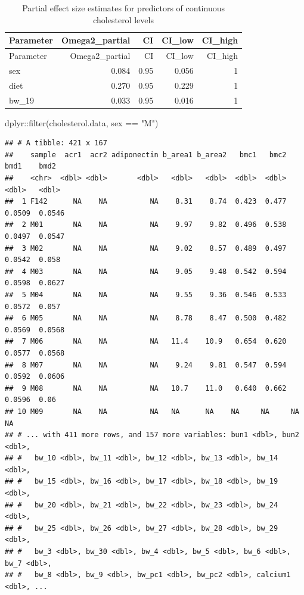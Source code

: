 \documentclass[
]{article}
\newenvironment{Shaded}{\begin{snugshade}}{\end{snugshade}}
\newcommand{\FunctionTok}[1]{\textcolor[rgb]{0.00,0.00,0.00}{#1}}
\newcommand{\NormalTok}[1]{#1}
\newcommand{\SpecialCharTok}[1]{\textcolor[rgb]{0.00,0.00,0.00}{#1}}
\newcommand{\StringTok}[1]{\textcolor[rgb]{0.31,0.60,0.02}{#1}}
\begin{document}
\begin{longtable}[]{@{}lrrrr@{}}
\caption{Partial effect size estimates for predictors of continuous
cholesterol levels}\tabularnewline
\toprule()
Parameter & Omega2\_partial & CI & CI\_low & CI\_high \\
\midrule()
\endfirsthead
\toprule()
Parameter & Omega2\_partial & CI & CI\_low & CI\_high \\
\midrule()
\endhead
sex & 0.084 & 0.95 & 0.056 & 1 \\
diet & 0.270 & 0.95 & 0.229 & 1 \\
bw\_19 & 0.033 & 0.95 & 0.016 & 1 \\
\bottomrule()
\end{longtable}

\begin{Shaded}
\begin{Highlighting}[]
\NormalTok{dplyr}\SpecialCharTok{::}\FunctionTok{filter}\NormalTok{(cholesterol.data, sex }\SpecialCharTok{==} \StringTok{"M"}\NormalTok{)}
\end{Highlighting}
\end{Shaded}

\begin{verbatim}
## # A tibble: 421 x 167
##    sample  acr1  acr2 adiponectin b_area1 b_area2   bmc1   bmc2    bmd1    bmd2
##    <chr>  <dbl> <dbl>       <dbl>   <dbl>   <dbl>  <dbl>  <dbl>   <dbl>   <dbl>
##  1 F142      NA    NA          NA    8.31    8.74  0.423  0.477  0.0509  0.0546
##  2 M01       NA    NA          NA    9.97    9.82  0.496  0.538  0.0497  0.0547
##  3 M02       NA    NA          NA    9.02    8.57  0.489  0.497  0.0542  0.058 
##  4 M03       NA    NA          NA    9.05    9.48  0.542  0.594  0.0598  0.0627
##  5 M04       NA    NA          NA    9.55    9.36  0.546  0.533  0.0572  0.057 
##  6 M05       NA    NA          NA    8.78    8.47  0.500  0.482  0.0569  0.0568
##  7 M06       NA    NA          NA   11.4    10.9   0.654  0.620  0.0577  0.0568
##  8 M07       NA    NA          NA    9.24    9.81  0.547  0.594  0.0592  0.0606
##  9 M08       NA    NA          NA   10.7    11.0   0.640  0.662  0.0596  0.06  
## 10 M09       NA    NA          NA   NA      NA    NA     NA     NA      NA     
## # ... with 411 more rows, and 157 more variables: bun1 <dbl>, bun2 <dbl>,
## #   bw_10 <dbl>, bw_11 <dbl>, bw_12 <dbl>, bw_13 <dbl>, bw_14 <dbl>,
## #   bw_15 <dbl>, bw_16 <dbl>, bw_17 <dbl>, bw_18 <dbl>, bw_19 <dbl>,
## #   bw_20 <dbl>, bw_21 <dbl>, bw_22 <dbl>, bw_23 <dbl>, bw_24 <dbl>,
## #   bw_25 <dbl>, bw_26 <dbl>, bw_27 <dbl>, bw_28 <dbl>, bw_29 <dbl>,
## #   bw_3 <dbl>, bw_30 <dbl>, bw_4 <dbl>, bw_5 <dbl>, bw_6 <dbl>, bw_7 <dbl>,
## #   bw_8 <dbl>, bw_9 <dbl>, bw_pc1 <dbl>, bw_pc2 <dbl>, calcium1 <dbl>, ...
\end{verbatim}
\end{document}

